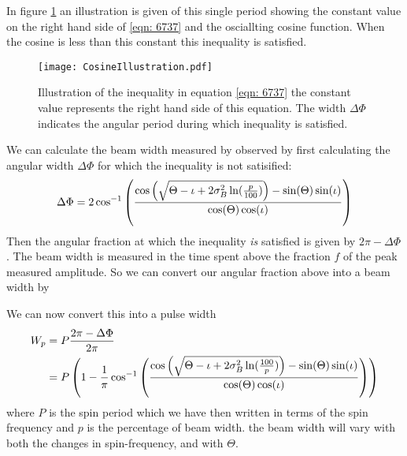 \documentclass[/home/greg/Thesis/main/main.tex]{subfiles}
\begin{document}
In figure \ref{fig: CosineIllustration} an illustration is given of this single
period showing the constant value on the right hand side of \eqref{eqn: 6737} and
the osciallting cosine function. When the cosine is less than this constant
this inequality is satisfied.
\begin{figure}[ht]
\centering
\texttt{[image: CosineIllustration.pdf]}
\caption{Illustration of the inequality in equation \eqref{eqn: 6737} the constant
         value represents the right hand side of this equation. The
         width $\Delta\Phi$ indicates the angular period during which inequality
         is satisfied.}
\label{fig: CosineIllustration}
\end{figure}

We can calculate the beam width measured by observed by first calculating the
angular width $\Delta\Phi$ for which the inequality is not satisified:
\begin{equation}
    \Delta\Phi = 2\cos^{-1}\left(
                \frac{\cos\left(\sqrt{\Theta - \iota + 2\sigma_{B}^{2} \ln(\frac{p}{100})}\right) - \sin(\Theta)\sin(\iota)}
                          {\cos(\Theta)\cos(\iota)}
                      \right)
\end{equation}
Then the angular fraction at which the inequality \emph{is} satisfied is given by
$2\pi - \Delta\Phi$. The beam width is measured in the time spent above the 
fraction $f$ of the peak measured amplitude. So we can convert our angular 
fraction above into a beam width by

We can now convert this into a pulse width 
\begin{align}
    W_p & = P \frac{2\pi - \Delta\Phi}{2\pi} \\
          & = P\left(1 -
               \frac{1}{\pi}\cos^{-1}\left(
                   \frac{\cos\left(\sqrt{\Theta - \iota 
                         + 2\sigma_{B}^{2} \ln(\frac{100}{p})}\right)
                    - \sin(\Theta)\sin(\iota)}
                          {\cos(\Theta)\cos(\iota)}
                      \right)
                  \right)
\label{eqn: Wp}
\end{align}
where $P$ is the spin period which we have then written in terms of the spin
frequency and $p$ is the percentage of beam width. 
the beam width will vary with both the changes in spin-frequency, and with
$\Theta$.

\end{document}
